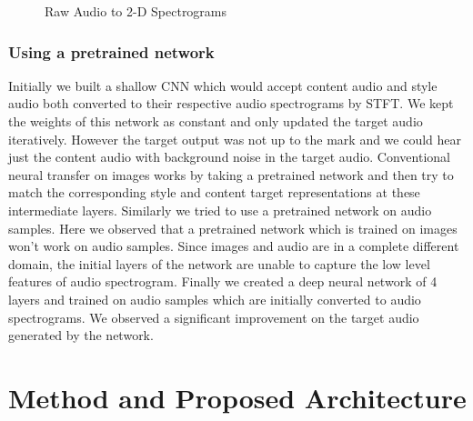 \documentclass[10pt,twocolumn,letterpaper]{article}
\begin{document}
\begin{figure}
\begin{center}
\end{center}
   \caption{Raw Audio to 2-D Spectrograms}
\label{fig:short}
\end{figure}

\subsubsection{Using a pretrained network}
Initially we built a shallow CNN which would accept content audio and style audio both converted to their respective audio spectrograms by STFT. We kept the weights of this network as constant and only updated the target audio iteratively. However the target output was not up to the mark and we could hear just the content audio with background noise in the target audio. Conventional neural transfer on images works by taking a pretrained network and then try to match the corresponding style and content target representations at these intermediate layers. Similarly we tried to use a pretrained network on audio samples. Here we observed that a pretrained network which is trained on images won't work on audio samples. Since images and audio are in a complete different domain, the initial layers of the network are unable to capture the low level features of audio spectrogram. Finally we created a deep neural network of 4 layers and trained on audio samples which are initially converted to audio spectrograms. We observed a significant improvement on the target audio generated by the network.



\section{Method and Proposed Architecture}
\end{document}
